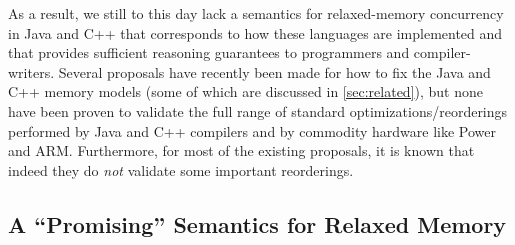 



%


As a result, we still to this day lack a semantics for relaxed-memory
concurrency in Java and C++ that corresponds to how these languages
are implemented and that provides sufficient reasoning guarantees to
programmers and compiler-writers.  Several proposals have recently
been made for how to fix the Java and C++ memory models (some of which
are discussed in \cref{sec:related}), but none have been proven to
validate the full range of standard optimizations/reorderings
performed by Java and C++ compilers and by commodity hardware like
Power and ARM.  Furthermore, for most of the existing proposals, it is
known that indeed they do \emph{not} validate some important
reorderings.

\subsection{A ``Promising'' Semantics for Relaxed Memory}
\label{sec:promising}

